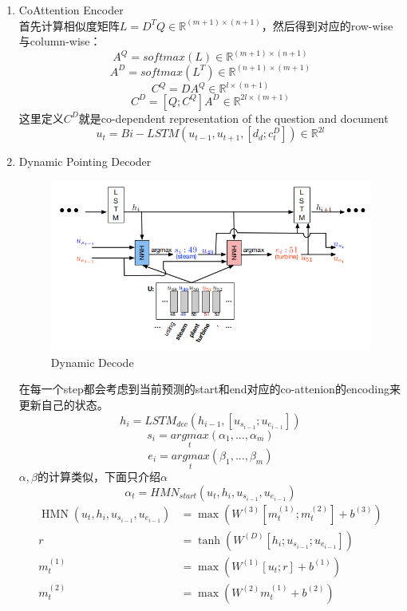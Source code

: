 \documentclass[a4paper,UTF8]{article}
\numberwithin{equation}{section}
\begin{document}
\begin{enumerate}
	\item CoAttention Encoder\\
	首先计算相似度矩阵$L=D^TQ \in \mathbb{R}^{(m+1)\times (n+1)}$，然后得到对应的row-wise与column-wise：
	$$A^Q = softmax (L) \in \mathbb{R}^{(m+1)\times (n+1)}$$
	$$A^D = softmax (L^T) \in \mathbb{R}^{(n+1)\times (m+1)}$$
	$$C^Q=DA^Q \in \mathbb{R}^{l\times (n+1)}$$
	$$C^D=[Q;C^Q]A^D \in \mathbb{R}^{2l\times (m+1)}$$
	这里定义$C^D$就是co-dependent representation of the question and document
	$$u_t = Bi-LSTM(u_{t-1},u_{t+1},[d_d;c_t^D]) \in \mathbb{R}^{2l}$$
	\item Dynamic Pointing Decoder\\
	\begin{figure}[H]
		\centering
		\includegraphics[width=\textwidth]{2-3.png}
		\caption{Dynamic Decode}
	\end{figure}
	在每一个step都会考虑到当前预测的start和end对应的co-attenion的encoding来更新自己的状态。
	$$h_i = LSTM_{dec}(h_{i-1},[u_{s_{i-1}};u_{e_{i-1}}])$$
	$$s_i=\underset{t}{argmax}(\alpha_1,...,\alpha_m)$$
	$$e_i=\underset{t}{argmax}(\beta_1,...,\beta_m)$$
	$\alpha,\beta$的计算类似，下面只介绍$\alpha$
	$$\alpha_t=HMN_{start}(u_t,h_i,u_{s_{i-1}},u_{e_{i-1}})$$
	$$
\begin{aligned} \operatorname{HMN}\left(u_{t}, h_{i}, u_{s_{i-1}}, u_{e_{i-1}}\right) &=\max \left(W^{(3)}\left[m_{t}^{(1)} ; m_{t}^{(2)}\right]+b^{(3)}\right) \\ r &=\tanh \left(W^{(D)}\left[h_{i} ; u_{s_{i-1}} ; u_{e_{i-1}}\right]\right) \\ m_{t}^{(1)} &=\max \left(W^{(1)}\left[u_{t} ; r\right]+b^{(1)}\right) \\ m_{t}^{(2)} &=\max \left(W^{(2)} m_{t}^{(1)}+b^{(2)}\right) \end{aligned}
$$
	\begin{figure}[H]

\end{figure}
\end{enumerate}
\end{document}
